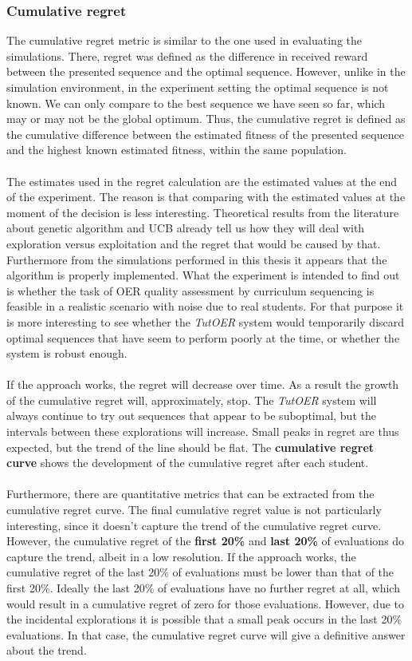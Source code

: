 \subsubsection{Cumulative regret}
The cumulative regret metric is similar to the one used in evaluating the
simulations. There, regret was defined as the difference in received reward
between the presented sequence and the optimal sequence. However, unlike in the
simulation environment, in the experiment setting the optimal sequence is not
known. We can only compare to the best sequence we have seen so far, which may
or may not be the global optimum. Thus, the cumulative regret is defined as the
cumulative difference between the estimated fitness of the presented sequence
and the highest known estimated fitness, within the same population.\\\\
\noindent
The estimates used in the regret calculation are the estimated values at the
end of the experiment. The reason is that comparing with the estimated values
at the moment of the decision is less interesting. Theoretical results from the
literature about genetic algorithm and UCB already tell us how they will deal
with exploration versus exploitation and the regret that would be caused by
that. Furthermore from the simulations performed in this thesis it appears that
the algorithm is properly implemented. What the experiment is intended to find
out is whether the task of OER quality assessment by curriculum sequencing is
feasible in a realistic scenario with noise due to real students. For that
purpose it is more interesting to see whether the \emph{TutOER} system would
temporarily discard optimal sequences that have seem to perform poorly at the
time, or whether the system is robust enough.\\\\
\noindent
If the approach works, the regret will decrease over time. As a result the
growth of the cumulative regret will, approximately, stop. The \emph{TutOER}
system will always continue to try out sequences that appear to be suboptimal,
but the intervals between these explorations will increase. Small peaks in
regret are thus expected, but the trend of the line should be flat. The
\textbf{cumulative regret curve} shows the development of the cumulative regret
after each student.\\\\
\noindent
Furthermore, there are quantitative metrics that can be extracted from
the cumulative regret curve. The final cumulative regret value is not
particularly interesting, since it doesn't capture the trend of the cumulative
regret curve. However, the cumulative regret of the \textbf{first 20\%} and
\textbf{last 20\%} of evaluations do capture the trend, albeit in a low
resolution. If the approach works, the cumulative regret of the last 20\% of
evaluations must be lower than that of the first 20\%. Ideally the last 20\% of
evaluations have no further regret at all, which would result in a cumulative
regret of zero for those evaluations. However, due to the incidental
explorations it is possible that a small peak occurs in the last 20\%
evaluations. In that case, the cumulative regret curve will give a definitive
answer about the trend.
